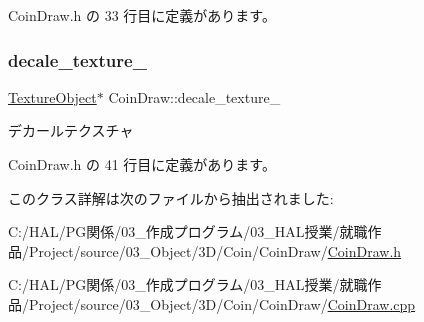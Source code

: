  Coin\+Draw.\+h の 33 行目に定義があります。

\mbox{\label{class_coin_draw_ab694450b118b4a251bcff5816df85168}} 
\subsubsection{\texorpdfstring{decale\+\_\+texture\+\_\+}{decale\_texture\_}}
{\footnotesize\ttfamily \mbox{\hyperlink{class_texture_object}{Texture\+Object}}$\ast$ Coin\+Draw\+::decale\+\_\+texture\+\_\+\hspace{0.3cm}{\ttfamily [private]}}



デカールテクスチャ 



 Coin\+Draw.\+h の 41 行目に定義があります。



このクラス詳解は次のファイルから抽出されました\+:\begin{DoxyCompactItemize}
\item 
C\+:/\+H\+A\+L/\+P\+G関係/03\+\_\+作成プログラム/03\+\_\+\+H\+A\+L授業/就職作品/\+Project/source/03\+\_\+\+Object/3\+D/\+Coin/\+Coin\+Draw/\mbox{\hyperlink{_coin_draw_8h}{Coin\+Draw.\+h}}\item 
C\+:/\+H\+A\+L/\+P\+G関係/03\+\_\+作成プログラム/03\+\_\+\+H\+A\+L授業/就職作品/\+Project/source/03\+\_\+\+Object/3\+D/\+Coin/\+Coin\+Draw/\mbox{\hyperlink{_coin_draw_8cpp}{Coin\+Draw.\+cpp}}\end{DoxyCompactItemize}
